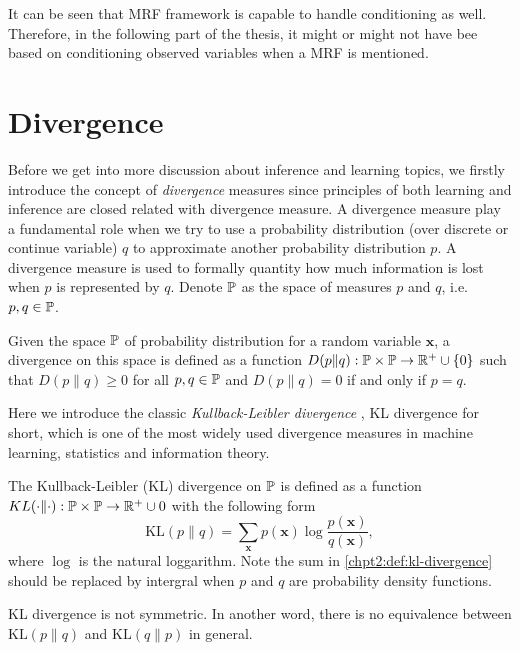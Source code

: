 It can be seen that MRF framework is capable to handle conditioning as well. Therefore, in the following part of the thesis, it might or might not have bee based on conditioning observed variables when a MRF is mentioned. 

\section{Divergence}\label{chpt2:sec:devergence}
Before we get into more discussion about inference and learning topics, we firstly introduce the concept of \textit{divergence} measures since principles of both learning and inference are closed related with divergence measure.
A divergence measure play a fundamental role when we try to use a probability distribution (over discrete or continue variable)  $q$ to approximate another probability distribution $p$. A divergence measure is used to formally quantity how much information is lost when $p$ is represented by $q$. Denote $\mathbb{P}$ as the space of measures $p$ and $q$, i.e. $p, q \in \mathbb{P}$.
\begin{definition}
  Given the space $\mathbb{P}$ of probability distribution for a random variable $\bm{x}$, a divergence on this space is defined as a function $D(p\|q): \mathbb{P} \times \mathbb{P} \rightarrow \mathbb{R}^{+}\cup \{0\}$ such that $D(p\|q) \geq 0$ for all $p, q \in \mathbb{P}$ and $D(p\|q)=0$ if and only if $p=q$.
\end{definition}

Here we introduce the classic \textit{Kullback-Leibler divergence} \cite{kullback1959, kullback1951}, KL divergence for short, which is one of the most widely used divergence measures in machine learning, statistics and information theory.
\begin{definition}
  The Kullback-Leibler (KL) divergence on $\mathbb{P}$ is defined as a function $KL(\cdot \| \cdot): \mathbb{P} \times \mathbb{P} \rightarrow \mathbb{R}^{+} \cup {0}$ with the following form
  \begin{equation}\label{chpt2:def:kl-divergence}
    \mathrm{KL}(p\|q) = \sum_{\bm{x}}p(\bm{x}) \log{\frac{p(\bm{x})}{q(\bm{x})}},
  \end{equation}
  where $\log$ is the natural loggarithm. Note the sum in \ref{chpt2:def:kl-divergence} should be replaced by intergral when $p$ and $q$ are probability density functions.
\end{definition}


KL divergence is not symmetric. In another word, there is no equivalence between $\mathrm{KL}(p\|q)$ and $\mathrm{KL}(q\|p)$ in general. 



